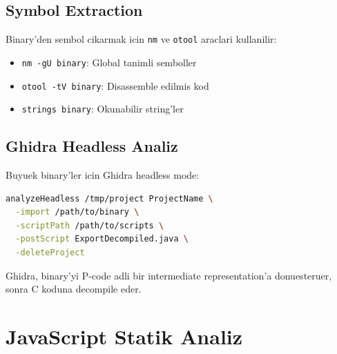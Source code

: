\documentclass[12pt,a4paper,oneside]{book}
\theoremstyle{definition}
\newcommand{\code}[1]{\texttt{\color{green!60!white}#1}}
\begin{document}
\begin{center}
\end{center}

\subsection{Symbol Extraction}

Binary'den sembol cikarmak icin \code{nm} ve \code{otool} araclari kullanilir:

\begin{itemize}
\item \code{nm -gU binary}: Global tanimli semboller
\item \code{otool -tV binary}: Disassemble edilmis kod
\item \code{strings binary}: Okunabilir string'ler
\end{itemize}

\subsection{Ghidra Headless Analiz}

Buyuek binary'ler icin Ghidra headless mode:

\begin{lstlisting}[language=bash,caption={Ghidra headless invocation}]
analyzeHeadless /tmp/project ProjectName \
  -import /path/to/binary \
  -scriptPath /path/to/scripts \
  -postScript ExportDecompiled.java \
  -deleteProject
\end{lstlisting}

Ghidra, binary'yi P-code adli bir intermediate representation'a donuesteruer, sonra C koduna decompile eder.

\section{JavaScript Statik Analiz}
\end{document}
